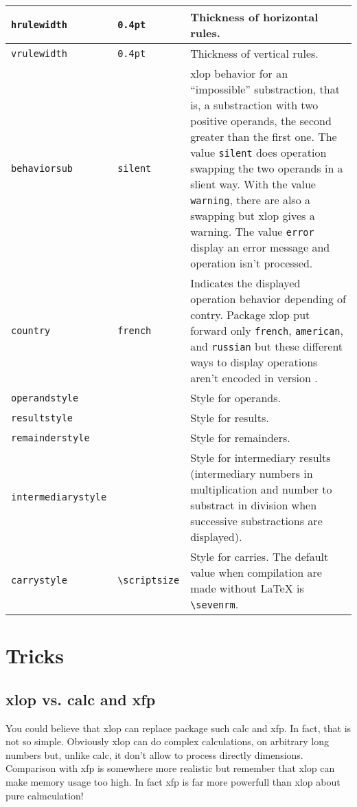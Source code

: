 \documentclass[12pt]{report}
\newcommand\package[1]{\textsf{#1}}
\begin{document}
\begin{longtable}{|l|l|p{7cm}|}
  \verb+hrulewidth+ &
  \verb+0.4pt+ &
  Thickness of horizontal rules. \\\hline
  \verb+vrulewidth+ &
  \verb+0.4pt+ &
  Thickness of vertical rules. \\\hline
  \verb+behaviorsub+ &
  \verb+silent+ &
  \package{xlop} behavior for an ``impossible'' substraction, that is,
  a substraction with two positive operands, the second greater
  than the first one. The value  \verb+silent+ does operation swapping
  the two operands in a slient way. With the value \verb+warning+,
  there are also a swapping but \package{xlop} gives a warning. The
  value \verb+error+ display an error message and operation isn't
  processed. \\\hline
  \verb+country+ &
  \verb+french+ &
  Indicates the displayed operation behavior depending of
  contry. Package \package{xlop} put forward only \verb+french+,
  \verb+american+, and \verb+russian+ but these different ways to
  display operations aren't encoded in version
  \fileversion{}. \\\hline
  \verb+operandstyle+ &
  &
  Style for operands. \\\hline
  \verb+resultstyle+ &
  &
  Style for results. \\\hline
  \verb+remainderstyle+ &
  &
  Style for remainders. \\\hline
  \verb+intermediarystyle+ &
  &
  Style for intermediary results (intermediary numbers in
  multiplication and number to substract in division when successive
  substractions are displayed). \\\hline
  \verb+carrystyle+ &
  \verb+\scriptsize+ &
  Style for carries. The default value when compilation are made
  without \LaTeX{} is \verb+\sevenrm+. \\\hline
\end{longtable}
\endgroup

\chapter{Tricks}
\label{chap:Trucs et astuces}
\section{\package{xlop} vs. \package{calc} and \package{xfp}}
You could believe that \package{xlop} can replace package such
\package{calc} and
\package{xfp}. In fact, that is not so
simple. Obviously \package{xlop} can do complex calculations, on arbitrary
long numbers but, unlike \package{calc}, it don't allow to process
directly dimensions. Comparison with \package{xfp} is somewhere more
realistic but remember that \package{xlop} can make memory usage too
high. In fact \package{xfp} is far more powerfull than \package{xlop}
about pure calmculation!
\end{document}
